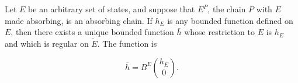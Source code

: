 Let $E$ be an arbitrary set of states, and suppose that $E^P$, the chain $P$ with $E$ made absorbing, is an absorbing chain. If $h_E$ is any bounded function defined on $E$, then there exists a unique bounded function $\bar{h}$ whose restriction to $E$ is $h_E$ and which is regular on $\tilde{E}$. The function is

$$\bar{h} = B^E \binom{h_E}{0}.$$
